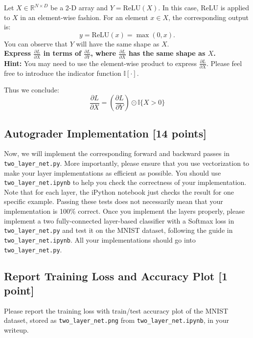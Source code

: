 \documentclass[lang=cn,11pt]{elegantbook}
\begin{document}
Let \( X \in \mathbb{R}^{N \times D} \) be a 2-D array and \( Y = \text{ReLU}(X) \). In this case, ReLU is applied to \( X \) in an element-wise fashion. For an element \( x \in X \), the corresponding output is: \[
y = \text{ReLU}(x) = \max(0, x).
\]
You can observe that \( Y \) will have the same shape as \( X \).\\
\textbf{Express \( \frac{\partial L}{\partial X} \) in terms of \( \frac{\partial L}{\partial Y} \), where \( \frac{\partial L}{\partial X} \) has the same shape as \( X \).\\}
\textbf{Hint:} You may need to use the element-wise product to express \( \frac{\partial L}{\partial X} \). Please feel free to introduce the indicator function \( \mathbb{I}[\cdot] \).
\begin{solution}
     Thus we conclude: \[
    \frac{\partial L}{\partial X} =  (\frac{\partial L} {\partial Y}) \odot \mathbb{I}\{X>0\}
    \]
\end{solution}


\subsection{Autograder Implementation [14 points]}

Now, we will implement the corresponding forward and backward passes in \texttt{two\_layer\_net.py}. More importantly, please ensure that you use vectorization to make your layer implementations as efficient as possible. You should use \texttt{two\_layer\_net.ipynb} to help you check the correctness of your implementation. Note that for each layer, the iPython notebook just checks the result for one specific example. Passing these tests does not necessarily mean that your implementation is 100\% correct.
Once you implement the layers properly, please implement a two fully-connected layer-based classifier with a Softmax loss in \texttt{two\_layer\_net.py} and test it on the MNIST dataset, following the guide in \texttt{two\_layer\_net.ipynb}. All your implementations should go into \texttt{two\_layer\_net.py}.
\subsection*{Report Training Loss and Accuracy Plot [1 point]}
Please report the training loss with train/test accuracy plot of the MNIST dataset, stored as \texttt{two\_layer\_net.png} from \texttt{two\_layer\_net.ipynb}, in your writeup.
\begin{solution}
\end{solution}
\end{document}

